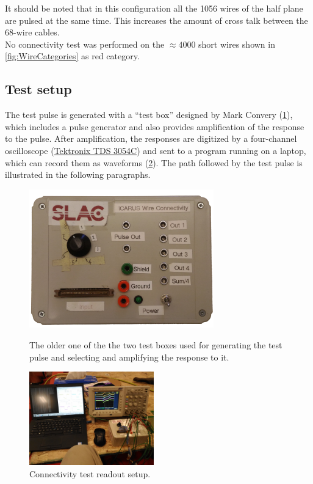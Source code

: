 It should be noted that in this configuration all the 1056 wires of the half
plane are pulsed at the same time. This increases the amount of cross talk
between the 68-wire cables.
\\
No connectivity test was performed on the $\approx 4000$ short wires shown in
\cref{fig:WireCategories} as red category.


\subsection{Test setup}
\label{ssec:methodology:setup}

The test pulse is generated with a ``test box'' designed by Mark Convery
(\cref{fig:TestBox}), which includes a pulse generator and also provides
amplification of the response to the pulse.
After amplification, the responses are digitized by a four-channel oscilloscope
(\href{https://www.tek.com/datasheet/digital-phosphor-oscilloscopes-0}{Tektronix TDS 3054C})
and sent to a program running on a laptop, which can record them as waveforms
(\cref{fig:TestSetup}).
The path followed by the test pulse is illustrated in the following paragraphs.
\\
\begin{figure}
  {
    \centering
    \includegraphics[height=6cm]{fig/20190501_113323-TestBox}\\
  }
  \caption{\label{fig:TestBox}
    The older one of the the two test boxes used for generating the test pulse
    and selecting and amplifying the response to it.
  }
\end{figure}
\begin{figure}
  \qquad
  \includegraphics[width=0.48\textwidth]{fig/2018-12-01_16-29-52-ConnectivityTestReadoutSetup}
  \caption{\label{fig:TestSetup}
    Connectivity test readout setup.
  }
\end{figure}
